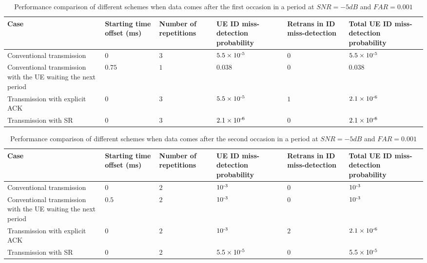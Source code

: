 \documentclass{report}
\begin{document}
\begin{table}[htbp]
\caption{Performance comparison of different schemes when data comes after the first occasion in a period at $SNR = -5dB$ and $FAR = 0.001$}
\begin{center}
\begin{tabular}{|p{6em}|p{4em}|p{4em}|p{4em}|p{4em}|p{4em}|}
 \hline
 \textbf{Case} & \textbf{Starting time offset (ms)}&\textbf{Number of repetitions}&\textbf{UE ID miss-detection probability}&\textbf{Retrans in ID miss-detection}&\textbf{Total UE ID miss-detection probability}\\
 \hline
 Conventional transmission&$0$&$3$&$5.5\times10\textsuperscript{-5}$&$0$&$5.5\times10\textsuperscript{-5}$\\
 \hline
 Conventional transmission with the UE waiting the next period&$0.75$&$1$&$0.038$&$0$&$0.038$\\
 \hline
Transmission with explicit ACK&$0$&$3$&$5.5\times10\textsuperscript{-5}$&$1$&$2.1\times10\textsuperscript{-6}$\\
\hline
Transmission with SR&$0$&$3$&$2.1\times10\textsuperscript{-6}$&$0$&$2.1\times10\textsuperscript{-6}$\\
 \hline
\end{tabular}
\label{tab12}
\end{center}
\end{table}

\begin{table}[htbp]
\caption{Performance comparison of different schemes when data comes after the second occasion in a period at $SNR = -5dB$ and $FAR = 0.001$}
\begin{center}
\begin{tabular}{|p{6em}|p{4em}|p{4em}|p{4em}|p{4em}|p{4em}|}
 \hline
 \textbf{Case} & \textbf{Starting time offset (ms)}&\textbf{Number of repetitions}&\textbf{UE ID miss-detection probability}&\textbf{Retrans in ID miss-detection}&\textbf{Total UE ID miss-detection probability}\\
 \hline
 Conventional transmission&$0$&$2$&$10\textsuperscript{-3}$&$0$&$10\textsuperscript{-3}$\\
 \hline
 Conventional transmission with the UE waiting the next period&$0.5$&$2$&$10\textsuperscript{-3}$&$0$&$10\textsuperscript{-3}$\\
 \hline
Transmission with explicit ACK&$0$&$2$&$10\textsuperscript{-3}$&$2$&$2.1\times10\textsuperscript{-6}$\\
\hline
Transmission with SR&$0$&$2$&$5.5\times10\textsuperscript{-5}$&$0$&$5.5\times10\textsuperscript{-5}$\\
 \hline
\end{tabular}
\label{tab13}
\end{center}
\end{table}
\end{document}
